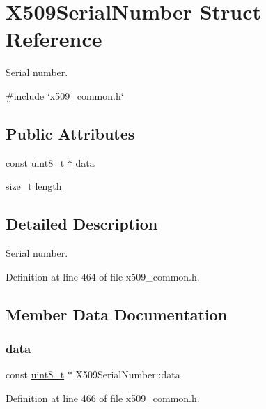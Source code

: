\hypertarget{structX509SerialNumber}{}\section{X509\+Serial\+Number Struct Reference}
\label{structX509SerialNumber}


Serial number.  




{\ttfamily \#include \char`\"{}x509\+\_\+common.\+h\char`\"{}}

\subsection*{Public Attributes}
\begin{DoxyCompactItemize}
\item 
const \hyperlink{stdint_8h_aba7bc1797add20fe3efdf37ced1182c5}{uint8\+\_\+t} $\ast$ \hyperlink{structX509SerialNumber_a04490ca0624096caf478beed3331d552}{data}
\item 
size\+\_\+t \hyperlink{structX509SerialNumber_ab076f0a46bcefa47cdc8135d5990ab78}{length}
\end{DoxyCompactItemize}


\subsection{Detailed Description}
Serial number. 

Definition at line 464 of file x509\+\_\+common.\+h.



\subsection{Member Data Documentation}
\mbox{\label{structX509SerialNumber_a04490ca0624096caf478beed3331d552}} 
\subsubsection{\texorpdfstring{data}{data}}
{\footnotesize\ttfamily const \hyperlink{stdint_8h_aba7bc1797add20fe3efdf37ced1182c5}{uint8\+\_\+t} $\ast$ X509\+Serial\+Number\+::data}



Definition at line 466 of file x509\+\_\+common.\+h.

